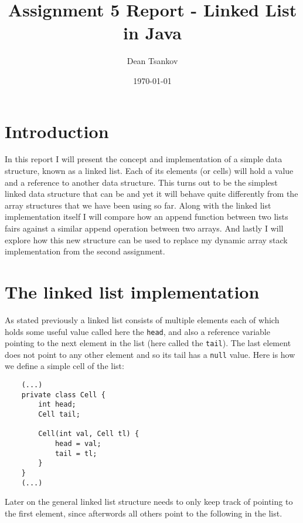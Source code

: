 \documentclass[a4paper,11pt]{article}
\begin{document}
\title{
    \textbf{Assignment 5 Report - Linked List in Java}
}
\author{Dean Tsankov}
\date{\today}

\maketitle

\section*{Introduction}

In this report I will present the concept and implementation of a simple data structure, known as a linked list. Each of its elements (or cells) will hold a value and a reference to another data structure. This turns out to be the simplest linked data structure that can be and yet it will behave quite differently from the array structures that we have been using so far. Along with the linked list implementation itself I will compare how an append function between two lists fairs against a similar append operation between two arrays. And lastly I will explore how this new structure can be used to replace my dynamic array stack implementation from the second assignment.

\section*{The linked list implementation}
As stated previously a linked list consists of multiple elements each of which holds some useful value called here the {\tt head}, and also a reference variable pointing to the next element in the list (here called the {\tt tail}). The last element does not point to any other element and so its tail has a {\tt null} value. Here is how we define a simple cell of the list:

\begin{verbatim}
    (...)
    private class Cell {
        int head;
        Cell tail;

        Cell(int val, Cell tl) {
            head = val;
            tail = tl;
        }
    }
    (...)
\end{verbatim}

Later on the general linked list structure needs to only keep track of pointing to the first element, since afterwords all others point to the following in the list. 
\\
\end{document}
